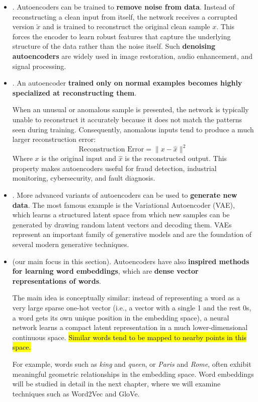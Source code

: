 \begin{itemize}
    Historically, autoencoders were frequently used as a pretraining mechanism: a network was first trained in an unsupervised way to learn useful features and then fine-tuned on a supervised task.
    
    
    \item {}. Autoencoders can be trained to \textbf{remove noise from data}. Instead of reconstructing a clean input from itself, the network receives a corrupted version $\tilde{x}$ and is trained to reconstruct the original clean sample $x$. This forces the encoder to learn robust features that capture the underlying structure of the data rather than the noise itself. Such \textbf{denoising autoencoders} are widely used in image restoration, audio enhancement, and signal processing.
    
    
    \item {}. An autoencoder \textbf{trained only on normal examples becomes highly specialized at reconstructing them}.
    
    When an unusual or anomalous sample is presented, the network is typically unable to reconstruct it accurately because it does not match the patterns seen during training. Consequently, anomalous inputs tend to produce a much larger reconstruction error:
    \begin{equation*}
        \text{Reconstruction Error} = \| x - \hat{x} \|^2
    \end{equation*}
    Where $x$ is the original input and $\hat{x}$ is the reconstructed output. This property makes autoencoders useful for fraud detection, industrial monitoring, cybersecurity, and fault diagnosis.
    
    
    \item {}. More advanced variants of autoencoders can be used to \textbf{generate new data}. The most famous example is the Variational Autoencoder (VAE), which learns a structured latent space from which new samples can be generated by drawing random latent vectors and decoding them. VAEs represent an important family of generative models and are the foundation of several modern generative techniques.
    
    
    \item {} (our main focus in this section). Autoencoders have also \textbf{inspired methods for learning word embeddings}, which are \textbf{dense vector representations of words}.

    The main idea is conceptually similar: instead of representing a word as a very large sparse one-hot vector (i.e., a vector with a single 1 and the rest 0s, a word gets its own unique position in the embedding space), a neural network learns a compact latent representation in a much lower-dimensional continuous space. \hl{Similar words tend to be mapped to nearby points in this space.}
    
    For example, words such as \emph{king} and \emph{queen}, or \emph{Paris} and \emph{Rome}, often exhibit meaningful geometric relationships in the embedding space. Word embeddings will be studied in detail in the next chapter, where we will examine techniques such as Word2Vec and GloVe.
\end{itemize}